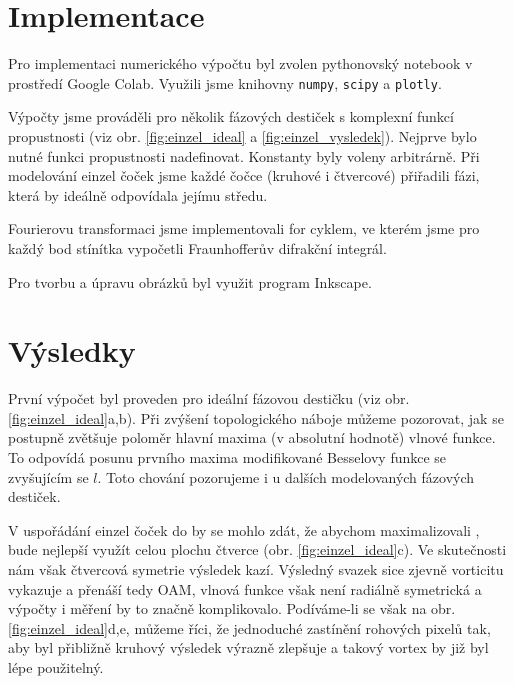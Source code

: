 \documentclass[a4paper,11pt]{article}
\newcommand{\iu}{\mathrm{i}}
\newcommand{\eul}{\mathrm{e}}
\begin{document}
\begin{multicols}{2}
\section{Implementace}

Pro implementaci numerického výpočtu byl zvolen pythonovský notebook v prostředí Google Colab. Využili jsme knihovny \verb|numpy|, \verb|scipy| a \verb|plotly|.

Výpočty jsme prováděli pro několik fázových destiček s komplexní funkcí propustnosti (viz obr. \ref{fig:einzel_ideal} a \ref{fig:einzel_vysledek}). Nejprve bylo nutné funkci propustnosti nadefinovat. Konstanty byly voleny arbitrárně. Při modelování einzel čoček jsme každé čočce (kruhové i čtvercové) přiřadili fázi, která by ideálně odpovídala jejímu středu. 

Fourierovu transformaci jsme implementovali for cyklem, ve kterém jsme pro každý bod stínítka vypočetli Fraunhofferův difrakční integrál.

Pro tvorbu a úpravu obrázků byl využit program Inkscape.

\section{Výsledky}
    
První výpočet byl proveden pro ideální fázovou destičku (viz obr. \ref{fig:einzel_ideal}a,b). Při zvýšení topologického náboje můžeme pozorovat, jak se postupně zvětšuje poloměr hlavní maxima (v absolutní hodnotě) vlnové funkce. To odpovídá posunu prvního maxima modifikované Besselovy funkce se zvyšujícím se $l$. Toto chování pozorujeme i u dalších modelovaných fázových destiček.

V uspořádání einzel čoček do   by se mohlo zdát, že abychom maximalizovali , bude nejlepší využít celou plochu čtverce (obr. \ref{fig:einzel_ideal}c). Ve skutečnosti nám však čtvercová symetrie výsledek kazí. Výsledný svazek sice zjevně vorticitu vykazuje a přenáší tedy OAM, vlnová funkce však není radiálně symetrická a výpočty i měření by to značně komplikovalo. Podíváme-li se však na obr. \ref{fig:einzel_ideal}d,e, můžeme říci, že jednoduché zastínění rohových pixelů tak, aby byl  přibližně kruhový výsledek výrazně zlepšuje a takový vortex by již byl lépe použitelný. 


\end{multicols}
\end{document}
